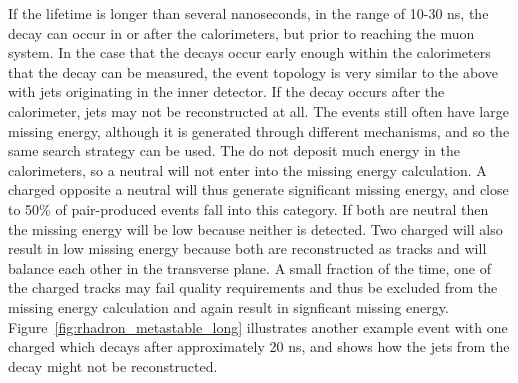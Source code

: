 If the lifetime is longer than several nanoseconds, in the range of 10-30 ns, the \rhadron decay can occur in or after the calorimeters, but prior to reaching the muon system.
In the case that the decays occur early enough within the calorimeters that the decay can be measured, the event topology is very similar to the above with jets originating in the inner detector.
If the decay occurs after the calorimeter, jets may not be reconstructed at all.
The events still often have large missing energy, although it is generated through different mechanisms, and so the same search strategy can be used.
The \rhadrons do not deposit much energy in the calorimeters, so a neutral \rhadron will not enter into the missing energy calculation.
A charged \rhadron opposite a neutral \rhadron will thus generate significant missing energy, and close to 50\% of pair-produced \rhadron events fall into this category.
If both \rhadrons are neutral then the missing energy will be low because neither is detected.
Two charged \rhadrons will also result in low missing energy because both are reconstructed as tracks and will balance each other in the transverse plane.
A small fraction of the time, one of the charged \rhadron tracks may fail quality requirements and thus be excluded from the missing energy calculation and again result in signficant missing energy.
Figure~\ref{fig:rhadron_metastable_long} illustrates another example event with one charged \rhadron which decays after approximately 20 ns, and shows how the jets from the decay might not be reconstructed.

